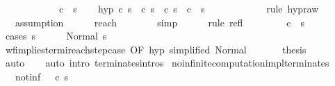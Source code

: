 \begin{isabellebody}
\ \ \ \ \ \ \ \ \ \ \ {\isasymLongrightarrow}\ {\isasymGamma}{\isasymturnstile}c{}\ {\isasymdown}\ s{}{\isachardoublequoteclose}\isanewline
\ \ \isamarkupfalse%
\ hyp{\isacharcolon}\ {\isachardoublequoteopen}{\isasymAnd}c{}\ s{}{\isachardot}\ {\isasymGamma}{\isasymturnstile}\ {\isacharparenleft}c{}{\isacharcomma}\ s{}{\isacharparenright}\ {\isasymrightarrow}\ {\isacharparenleft}c{}{\isacharcomma}\ s{}{\isacharparenright}\ {\isasymLongrightarrow}\ {\isasymGamma}{\isasymturnstile}c{}\ {\isasymdown}\ s{}{\isachardoublequoteclose}\isanewline
\ \ \ \ \isamarkupfalse%
\ {\isacharminus}\isanewline
\ \ \ \ \isamarkupfalse%
\ {\isacharparenleft}rule\ hyp{\isacharunderscore}raw{\isacharparenright}\isanewline
\ \ \ \ \isamarkupfalse%
\ \ \ assumption\isanewline
\ \ \ \ \isamarkupfalse%
\ reach\ \isanewline
\ \ \ \ \isamarkupfalse%
\ \ simp\isanewline
\ \ \ \ \isamarkupfalse%
\ {\isacharparenleft}rule\ refl{\isacharparenright}\isanewline
\ \ \ \ \isamarkupfalse%
\isanewline
\isanewline
\ \ \isamarkupfalse%
\ {\isachardoublequoteopen}{\isasymGamma}{\isasymturnstile}c{}\ {\isasymdown}\ s{}{\isachardoublequoteclose}\isanewline
\ \ \isamarkupfalse%
\ {\isacharparenleft}cases\ s{}{\isacharparenright}\isanewline
\ \ \ \ \isamarkupfalse%
\ {\isacharparenleft}Normal\ s{}{\isacharprime}{\isacharparenright}\isanewline
\ \ \ \ \isamarkupfalse%
\ wf{\isacharunderscore}implies{\isacharunderscore}termi{\isacharunderscore}reach{\isacharunderscore}step{\isacharunderscore}case\ {\isacharbrackleft}OF\ hyp\ {\isacharbrackleft}simplified\ Normal{\isacharbrackright}{\isacharbrackright}\ \isanewline
\ \ \ \ \isamarkupfalse%
\ {\isacharquery}thesis\isanewline
\ \ \ \ \ \ \isamarkupfalse%
\ auto\isanewline
\ \ \isamarkupfalse%
\ {\isacharparenleft}auto\ intro{\isacharcolon}\ terminates{\isachardot}intros{\isacharparenright}\isanewline
{}\isamarkupfalse%
%
\endisatagproof
{\isafoldproof}%
%
\isadelimproof
\isanewline
%
\endisadelimproof
\isanewline
{}\isamarkupfalse%
\ no{\isacharunderscore}infinite{\isacharunderscore}computation{\isacharunderscore}impl{\isacharunderscore}terminates{\isacharcolon}\isanewline
\ \ \ not{\isacharunderscore}inf{\isacharcolon}\ {\isachardoublequoteopen}{\isasymnot}\ {\isasymGamma}{\isasymturnstile}\ {\isacharparenleft}c{\isacharcomma}\ s{\isacharparenright}\ {\isasymrightarrow}\ {\isasymdots}{\isacharparenleft}{\isasyminfinity}{\isacharparenright}{\isachardoublequoteclose}\isanewline

\end{isabellebody}
